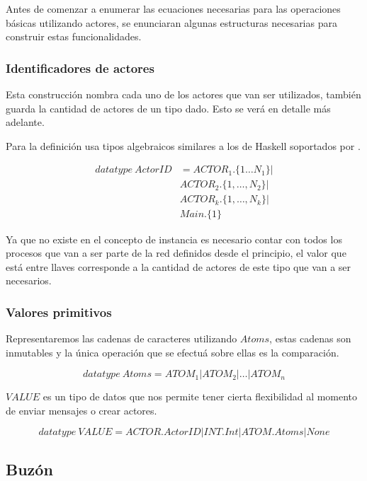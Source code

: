Antes de comenzar a enumerar las ecuaciones necesarias para las operaciones básicas utilizando actores, se enunciaran algunas estructuras necesarias para construir estas funcionalidades.

\subsubsection{Identificadores de actores}

Esta construcción nombra cada uno de los actores que van ser utilizados, también guarda la cantidad de actores de un tipo dado. Esto se verá en detalle más adelante.

Para la definición usa tipos algebraicos similares a los de Haskell soportados por \CSPm.

\begin{figure}[H]
\begin{align*}
  datatype\ ActorID &= ACTOR_1.\{1 \ldots N_1\} | \\
  & ACTOR_2.\{1, \ldots ,N_2\} | \\
  & ACTOR_k.\{1, \ldots, N_k\} | \\
  & Main.\{1\}
\end{align*}
\end{figure}

Ya que no existe en \CSP el concepto de instancia es necesario contar con todos los procesos que van a ser parte de la red definidos desde el principio, el valor que está entre llaves corresponde a la cantidad de actores de este tipo que van a ser necesarios. 

\subsubsection{Valores primitivos}

Representaremos las cadenas de caracteres utilizando $Atoms$, estas cadenas son inmutables y la única operación que se efectuá sobre ellas es la comparación.

\[
  datatype\ Atoms = ATOM_1 | ATOM_2 | \ldots | ATOM_n
\]

$VALUE$ es un tipo de datos que nos permite tener cierta flexibilidad al momento de enviar mensajes o crear actores. 

\[
  datatype\ VALUE = ACTOR.ActorID | INT.Int | ATOM.Atoms | None
\]

\subsection{Buzón} 

